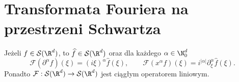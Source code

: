 \section{Transformata Fouriera na przestrzeni Schwartza}
\label{sec:pde8-transform}

\begin{twierdzenie}
\label{thm:pde8-rules}
Jeżeli $f\in\mathcal S(\R^d)$, to $\widehat f\in\mathcal S(\R^d)$
oraz dla każdego $\alpha\in\N_0^d$
\begin{equation}\label{eq:pde8-rules}
 \mathcal F(\partial^\alpha f)(\xi)=(i\xi)^\alpha\widehat f(\xi),
 \qquad \mathcal F(x^\alpha f)(\xi)=i^{|\alpha|}
 \partial_\xi^\alpha\widehat f(\xi).
\end{equation}
Ponadto $\mathcal F:\mathcal S(\R^d)\to\mathcal S(\R^d)$
jest ciągłym operatorem liniowym.
\end{twierdzenie}
